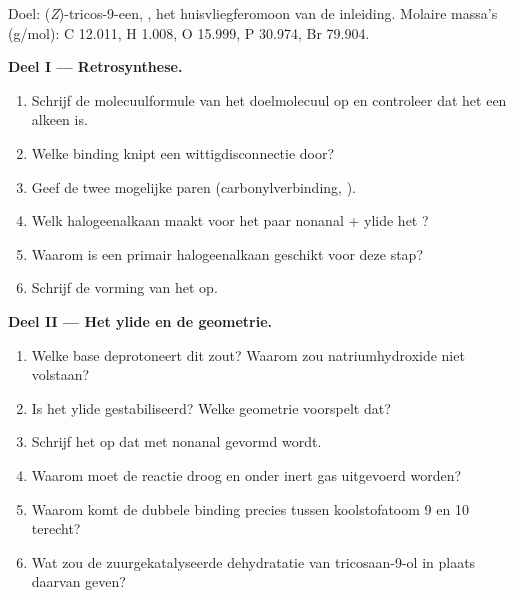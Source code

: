 \begin{problem}
\label{pb:b2:wittig:1}
Doel: (\textit{Z})-tricos-9-een, , het huisvliegferomoon van de
inleiding. Molaire massa's (\unit{g/mol}): C 12.011, H 1.008, O 15.999, P 30.974, Br 79.904.

\medskip
\noindent\textbf{Deel I --- Retrosynthese.}
\begin{enumerate}
  \item Schrijf de molecuulformule van het doelmolecuul op en controleer dat het een alkeen is.
  \item Welke binding knipt een wittigdisconnectie door?
  \item Geef de twee mogelijke paren (carbonylverbinding, ).
  \item Welk halogeenalkaan maakt voor het paar nonanal + ylide het ?
  \item Waarom is een primair halogeenalkaan geschikt voor deze stap?
  \item Schrijf de vorming van het  op.
\end{enumerate}

\medskip
\noindent\textbf{Deel II --- Het ylide en de geometrie.}
\begin{enumerate}[resume]
  \item Welke base deprotoneert dit zout? Waarom zou natriumhydroxide niet volstaan?
  \item Is het ylide gestabiliseerd? Welke geometrie voorspelt dat?
  \item Schrijf het  op dat met nonanal gevormd wordt.
  \item Waarom moet de reactie droog en onder inert gas uitgevoerd worden?
  \item Waarom komt de dubbele binding precies tussen koolstofatoom 9 en 10 terecht?
  \item Wat zou de zuurgekatalyseerde dehydratatie van tricosaan-9-ol in plaats daarvan geven?
\end{enumerate}


\end{problem}
